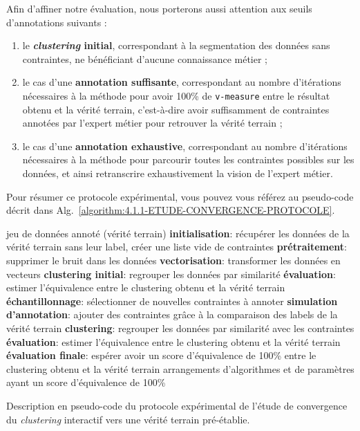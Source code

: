 				Afin d'affiner notre évaluation, nous porterons aussi attention aux seuils d'annotations suivants :
				\begin{enumerate}
					\item le \textbf{\textit{clustering} initial}, correspondant à la segmentation des données sans contraintes, ne bénéficiant d'aucune connaissance métier ;
					\item le cas d'une \textbf{annotation suffisante}, correspondant au nombre d'itérations nécessaires à la méthode pour avoir 100\% de \texttt{v-measure} entre le résultat obtenu et la vérité terrain, c'est-à-dire avoir suffisamment de contraintes annotées par l'expert métier pour retrouver la vérité terrain ;
					\item le cas d'une \textbf{annotation exhaustive}, correspondant au nombre d'itérations nécessaires à la méthode pour parcourir toutes les contraintes possibles sur les données, et ainsi retranscrire exhaustivement la vision de l'expert métier.
				\end{enumerate}
				
				Pour résumer ce protocole expérimental, vous pouvez vous référez au pseudo-code décrit dans Alg.~\ref{algorithm:4.1.1-ETUDE-CONVERGENCE-PROTOCOLE}.
				\begin{algorithm}
					\begin{algorithmic}[1]
						\Require jeu de données annoté (vérité terrain)
							\State \textbf{initialisation}: récupérer les données de la vérité terrain sans leur label, créer une liste vide de contraintes
							\State \textbf{prétraitement}: supprimer le bruit dans les données
							\State \textbf{vectorisation}: transformer les données en vecteurs
							\State \textbf{clustering initial}: regrouper les données par similarité
							\State \textbf{évaluation}: estimer l'équivalence entre le clustering obtenu et la vérité terrain
							\Repeat
								\State \textbf{échantillonnage}: sélectionner de nouvelles contraintes à annoter
								\State \textbf{simulation d'annotation}: ajouter des contraintes grâce à la comparaison des labels de la vérité terrain
								\State \textbf{clustering}: regrouper les données par similarité avec les contraintes
								\State \textbf{évaluation}: estimer l'équivalence entre le clustering obtenu et la vérité terrain
							\State \textbf{évaluation finale}: espérer avoir un score d'équivalence de 100\% entre le clustering obtenu et la vérité terrain
						\EndFor
						\Ensure arrangements d'algorithmes et de paramètres ayant un score d'équivalence de 100\%
					\end{algorithmic}
					\caption{Description en pseudo-code du protocole expérimental de l'étude de convergence du \textit{clustering} interactif vers une vérité terrain pré-établie.}
					\label{algorithm:4.1.1-ETUDE-CONVERGENCE-PROTOCOLE}
				\end{algorithm}
				
